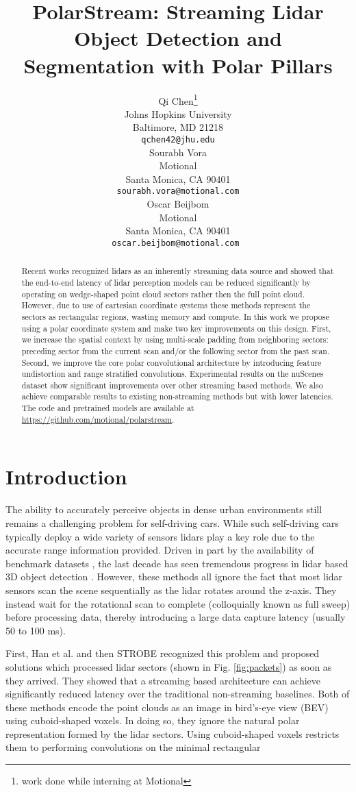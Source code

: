 \documentclass{article}
\title{PolarStream: Streaming Lidar Object Detection and Segmentation with Polar Pillars}
\author{Qi Chen\thanks{work done while interning at Motional} \\
  Johns Hopkins University\\
  Baltimore, MD 21218 \\
  \texttt{qchen42@jhu.edu} \\
\And
   Sourabh Vora \\
   Motional \\
   Santa Monica, CA 90401 \\
   \texttt{sourabh.vora@motional.com} \\
   \AND
   Oscar Beijbom \\
   Motional \\
   Santa Monica, CA 90401 \\
   \texttt{oscar.beijbom@motional.com } \\
}
\begin{document}
\maketitle

\begin{abstract}
Recent works recognized lidars as an inherently streaming data source and showed that the end-to-end latency of lidar perception models can be reduced significantly by operating on wedge-shaped point cloud sectors rather then the full point cloud. However, due to use of cartesian coordinate systems these methods  represent the sectors as rectangular regions, wasting memory and compute. In this work we propose using a polar coordinate system and make two key improvements on this design. First, we increase the spatial context by using multi-scale padding from neighboring sectors: preceding sector from the current scan and/or the following sector from the past scan. Second, we improve the core polar convolutional architecture by introducing feature undistortion and range stratified convolutions. Experimental results on the nuScenes dataset show significant improvements over other streaming based methods. We also achieve comparable results to existing non-streaming methods but with lower latencies. The code and pretrained models are available at  \url{https://github.com/motional/polarstream}. 
\end{abstract}
\section{Introduction}\label{intro}
The ability to accurately perceive objects in dense urban environments still remains a challenging problem for self-driving cars. While such self-driving cars typically deploy a wide variety of sensors lidars play a key role due to the accurate range information provided. Driven in part by the availability of benchmark datasets \cite{geiger2013vision, caesar2019nuscenes, sun2020scalability}, the last decade has seen tremendous progress in lidar based 3D object detection \cite{zhou2018voxelnet,lang2019pointpillars,yang2018pixor,meyer2019lasernet,fan2021rangedet}. However, these methods all ignore the fact that most lidar sensors scan the scene sequentially as the lidar rotates around the z-axis. They instead wait for the rotational scan to complete (colloquially known as full sweep) before processing data, thereby introducing a large data capture latency (usually 50 to 100 ms). 

First, Han et al. \cite{han2020streaming} and then STROBE \cite{frossard2020strobe} recognized this problem and proposed solutions which processed lidar sectors (shown in Fig. \ref{fig:packets}) as soon as they arrived. They showed that a streaming based architecture can achieve significantly reduced latency over the traditional non-streaming baselines. Both of these methods encode the point clouds as an image in bird's-eye view (BEV) using cuboid-shaped voxels. In doing so, they ignore the natural polar representation formed by the lidar sectors. Using cuboid-shaped voxels restricts them to performing convolutions on the minimal rectangular 
\end{document}
